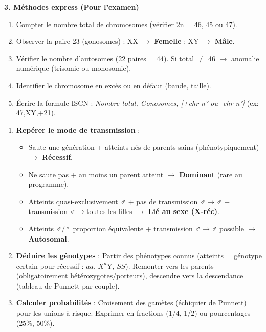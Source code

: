 \documentclass[11pt]{article}
\begin{document}
\begin{bilan}
\textbf{3. Méthodes express (Pour l'examen)}

\begin{methode}
\begin{enumerate}
  \item Compter le nombre total de chromosomes (vérifier 2n = 46, 45 ou 47).
  \item Observer la paire 23 (gonosomes) : XX $\rightarrow$ \textbf{Femelle} ; XY $\rightarrow$ \textbf{Mâle}.
  \item Vérifier le nombre d'autosomes (22 paires = 44). Si total $\neq$ 46 $\rightarrow$ anomalie numérique (trisomie ou monosomie).
  \item Identifier le chromosome en excès ou en défaut (bande, taille).
  \item Écrire la formule ISCN : \textit{Nombre total, Gonosomes, [+chr n° ou -chr n°]} (ex: 47,XY,+21).
\end{enumerate}
\end{methode}

\begin{methode}
\begin{enumerate}
  \item \textbf{Repérer le mode de transmission} :
    \begin{itemize}
      \item Saute une génération + atteints nés de parents sains (phénotypiquement) $\rightarrow$ \textbf{Récessif}.
      \item Ne saute pas + au moins un parent atteint $\rightarrow$ \textbf{Dominant} (rare au programme).
      \item Atteints quasi-exclusivement ♂ + pas de transmission ♂$\to$♂ + transmission ♂$\to$toutes les filles $\rightarrow$ \textbf{Lié au sexe (X-réc)}.
      \item Atteints ♂/♀ proportion équivalente + transmission ♂$\to$♂ possible $\rightarrow$ \textbf{Autosomal}.
    \end{itemize}
  \item \textbf{Déduire les génotypes} : Partir des phénotypes connus (atteints = génotype certain pour récessif : $aa$, $X^a$Y, $SS$). Remonter vers les parents (obligatoirement hétérozygotes/porteurs), descendre vers la descendance (tableau de Punnett par couple).
  \item \textbf{Calculer probabilités} : Croisement des gamètes (échiquier de Punnett) pour les unions à risque. Exprimer en fractions (1/4, 1/2) ou pourcentages (25\%, 50\%).
\end{enumerate}
\end{methode}


\end{bilan}
\end{document}
